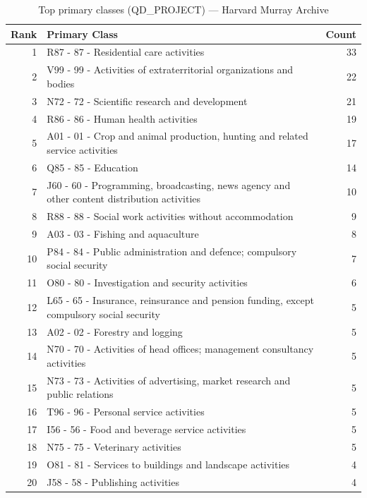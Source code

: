 \begin{table}[H]
    \centering
    \begin{tabular}{r p{10cm} r}
    \hline
    \textbf{Rank} & \textbf{Primary Class} & \textbf{Count} \\
    \hline
    1 & R87 - 87 - Residential care activities & 33 \\
    2 & V99 - 99 - Activities of extraterritorial organizations and bodies & 22 \\
    3 & N72 - 72 - Scientific research and development & 21 \\
    4 & R86 - 86 - Human health activities & 19 \\
    5 & A01 - 01 - Crop and animal production, hunting and related service activities & 17 \\
    6 & Q85 - 85 - Education & 14 \\
    7 & J60 - 60 - Programming, broadcasting, news agency and other content distribution activities & 10 \\
    8 & R88 - 88 - Social work activities without accommodation & 9 \\
    9 & A03 - 03 - Fishing and aquaculture & 8 \\
    10 & P84 - 84 - Public administration and defence; compulsory social security & 7 \\
    11 & O80 - 80 - Investigation and security activities & 6 \\
    12 & L65 - 65 - Insurance, reinsurance and pension funding, except compulsory social security & 5 \\
    13 & A02 - 02 - Forestry and logging & 5 \\
    14 & N70 - 70 - Activities of head offices; management consultancy activities & 5 \\
    15 & N73 - 73 - Activities of advertising, market research and public relations & 5 \\
    16 & T96 - 96 - Personal service activities & 5 \\
    17 & I56 - 56 - Food and beverage service activities & 5 \\
    18 & N75 - 75 - Veterinary activities & 5 \\
    19 & O81 - 81 - Services to buildings and landscape activities & 4 \\
    20 & J58 - 58 - Publishing activities & 4 \\
    \hline
    \end{tabular}
    \caption{Top primary classes (QD\_PROJECT) --- Harvard Murray Archive}
\end{table}

